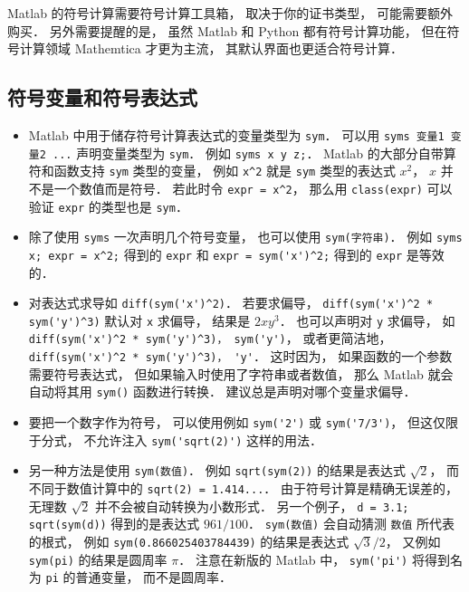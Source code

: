 

Matlab 的符号计算需要符号计算工具箱， 取决于你的证书类型， 可能需要额外购买． 另外需要提醒的是， 虽然 Matlab 和 Python 都有符号计算功能， 但在符号计算领域 Mathemtica 才更为主流， 其默认界面也更适合符号计算．

\subsection{符号变量和符号表达式}
\begin{itemize}
\item Matlab 中用于储存符号计算表达式的变量类型为 \verb|sym|． 可以用 \verb|syms 变量1 变量2 ...| 声明变量类型为 \verb|sym|． 例如 \verb|syms x y z;|． Matlab 的大部分自带算符和函数支持 \verb|sym| 类型的变量， 例如 \verb|x^2| 就是 \verb|sym| 类型的表达式 $x^2$， $x$ 并不是一个数值而是符号． 若此时令 \verb|expr = x^2|， 那么用 \verb|class(expr)| 可以验证 \verb|expr| 的类型也是 \verb|sym|．

\item 除了使用 \verb|syms| 一次声明几个符号变量， 也可以使用 \verb|sym(字符串)|． 例如 \verb|syms x; expr = x^2;| 得到的 \verb|expr| 和 \verb|expr = sym('x')^2;| 得到的 \verb|expr| 是等效的．

\item  对表达式求导如 \verb|diff(sym('x')^2)|． 若要求偏导， \verb|diff(sym('x')^2 * sym('y')^3)| 默认对 \verb|x| 求偏导， 结果是 $2x y^3$． 也可以声明对 \verb|y| 求偏导， 如 \verb|diff(sym('x')^2 * sym('y')^3)， sym('y')|， 或者更简洁地， \verb|diff(sym('x')^2 * sym('y')^3)， 'y'|． 这时因为， 如果函数的一个参数需要符号表达式， 但如果输入时使用了字符串或者数值， 那么 Matlab 就会自动将其用 \verb|sym()| 函数进行转换． 建议总是声明对哪个变量求偏导．

\item  要把一个数字作为符号， 可以使用例如 \verb|sym('2')| 或 \verb|sym('7/3')|， 但这仅限于分式， 不允许注入 \verb|sym('sqrt(2)')| 这样的用法．

\item 另一种方法是使用 \verb|sym(数值)|． 例如 \verb|sqrt(sym(2))| 的结果是表达式 $\sqrt 2$， 而不同于数值计算中的 \verb|sqrt(2) = 1.414...|． 由于符号计算是精确无误差的， 无理数 $\sqrt{2}$ 并不会被自动转换为小数形式． 另一个例子， \verb|d = 3.1; sqrt(sym(d))| 得到的是表达式 $961/100$． \verb|sym(数值)| 会自动猜测 \verb|数值| 所代表的根式， 例如 \verb|sym(0.866025403784439)| 的结果是表达式 $\sqrt{3}/2$， 又例如 \verb|sym(pi)| 的结果是圆周率 $\pi$． 注意在新版的 Matlab 中， \verb|sym('pi')| 将得到名为 \verb|pi| 的普通变量， 而不是圆周率．
\end{itemize}

